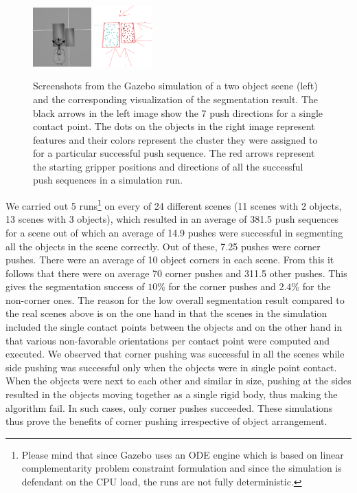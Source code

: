 \begin{figure}[h!]
  \begin{center}
    \includegraphics[width=0.2\textwidth]{figures/push_directions.pdf}  
    \includegraphics[width=0.2\textwidth]{figures/rviz_empty9_crop.pdf} 
    \caption{Screenshots from  the Gazebo  simulation of a  two object
      scene (left)   and  the   corresponding  visualization   of  the
      segmentation result. The black arrows in the left image show the
      7 push  directions for a single  contact point. The  dots on the
      objects in  the right image represent features  and their colors
      represent  the cluster they  were assigned  to for  a particular
      successful push sequence. The red arrows represent the starting gripper positions
      and  directions  of  all  the  successful push  sequences  in  a
      simulation run. }
         \label{fig:simulations}
  \end{center}
\end{figure}

We carried out 5 runs\footnote{Please mind that since Gazebo uses an ODE engine 
which is based on linear complementarity problem constraint formulation and since the
simulation is defendant on the CPU load, the runs are not fully deterministic.} 
on every of 24 different  scenes (11 scenes  with 2
objects, 13  scenes with  3 objects), which resulted in an average  of 381.5
push sequences for a scene out of which an average of 14.9 pushes were
successful in segmenting  all the objects in the  scene correctly. Out
of these, 7.25  pushes were corner pushes. There were an average  of 10
object corners in each scene. From this it follows that there were on average
70 corner pushes and 311.5 other pushes. This gives the segmentation success of $10\%$
for the corner pushes and $2.4\%$ for the non-corner ones. The reason for the low
overall segmentation result compared to the real scenes above is on the one hand in that the scenes in the simulation
included the single contact points between the objects and on the other hand in 
that various non-favorable orientations per contact point were computed and executed.
We observed  that corner pushing was successful  in all  the scenes while  side pushing  was successful
only  when  the  objects were in single point contact. 
When the  objects were next to each other  and similar in size,
pushing  at the sides  resulted in  the objects  moving together  as a
single rigid body, thus making the algorithm fail. In such cases, only
corner  pushes succeeded.  These simulations  thus prove the benefits of
corner pushing irrespective of object arrangement.



